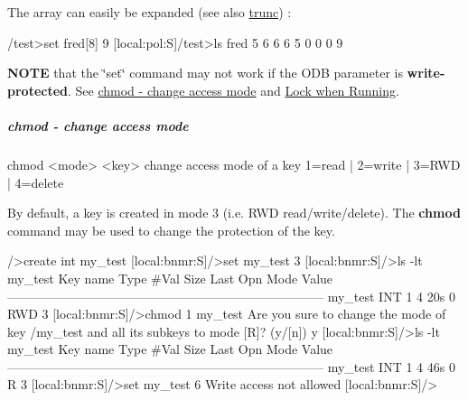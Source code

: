 The array can easily be expanded (see also \hyperlink{RC_odbedit_examples_RC_odbedit_trunc}{trunc}) :


\begin{DoxyCode}
/test>set fred[8] 9
[local:pol:S]/test>ls
fred
                                5
                                6
                                6
                                6
                                5
                                0
                                0
                                0
                                9
\end{DoxyCode}


\label{RC_odbedit_examples_RC_odbedit_set_wp}
\hypertarget{RC_odbedit_examples_RC_odbedit_set_wp}{}
 {\bfseries NOTE} that the \char`\"{}set\char`\"{} command may not work if the ODB parameter is {\bfseries write-\/protected}. See \hyperlink{RC_odbedit_examples_RC_odbedit_chmod}{chmod -\/ change access mode} and \hyperlink{RC_customize_ODB_RC_Lock_when_Running}{Lock when Running}.



\hypertarget{RC_odbedit_examples_RC_odbedit_chmod}{}\subparagraph{chmod -\/ change access mode}\label{RC_odbedit_examples_RC_odbedit_chmod}

\begin{DoxyCode}
chmod <mode> <key>       change access mode of a key
                          1=read | 2=write | 3=RWD | 4=delete
\end{DoxyCode}


By default, a key is created in mode 3 (i.e. RWD read/write/delete). The {\bfseries chmod} command may be used to change the protection of the key. 
\begin{DoxyCode}
/>create int my_test
[local:bnmr:S]/>set my_test 3
[local:bnmr:S]/>ls -lt my_test
Key name                        Type    #Val  Size  Last Opn Mode Value
---------------------------------------------------------------------------
my_test                         INT     1     4     20s  0   RWD  3
[local:bnmr:S]/>chmod 1 my_test
Are you sure to change the mode of key
  /my_test
and all its subkeys
to mode [R]? (y/[n]) y
[local:bnmr:S]/>ls -lt my_test
Key name                        Type    #Val  Size  Last Opn Mode Value
---------------------------------------------------------------------------
my_test                         INT     1     4     46s  0   R    3
[local:bnmr:S]/>set my_test 6
Write access not allowed
[local:bnmr:S]/> 
\end{DoxyCode}


